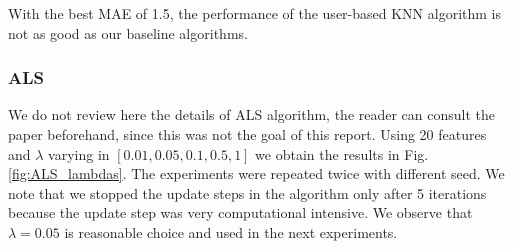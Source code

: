 \begin{figure}[h]
\begin{minipage}{\textwidth}
    \label{fig:KNN_kvalues}
  \end{minipage}
\end{figure}

With the best MAE of 1.5, the performance of the user-based KNN algorithm is not as good as our baseline algorithms. 

\subsubsection{ALS}
We do not review here the details of ALS algorithm, the reader can consult the paper \cite{Zhou:2008} beforehand, since this was not the goal of this report. Using 20 features and $\lambda$ varying in $[0.01,0.05,0.1,0.5,1]$ we obtain the results in Fig. \ref{fig:ALS_lambdas}. The experiments were repeated twice with different seed. We note that we stopped the update steps in the algorithm only after 5 iterations because the update step was very computational intensive. We observe that $\lambda = 0.05$ is reasonable choice and used in the next experiments.

